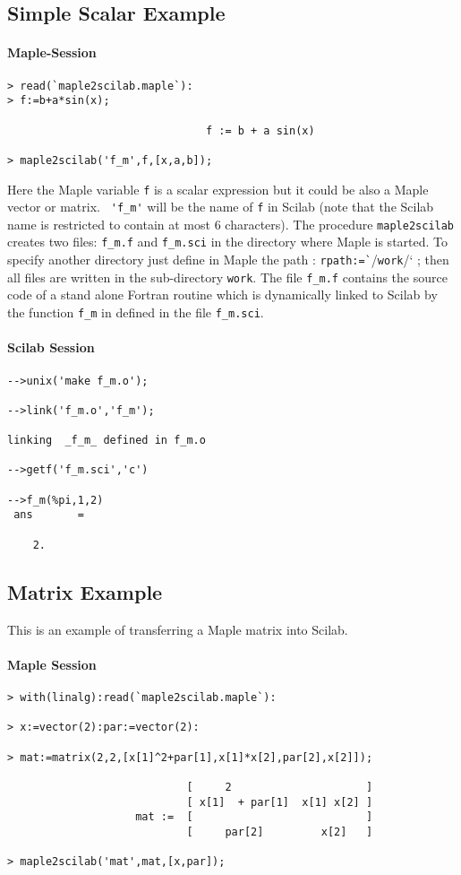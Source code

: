 \subsection{Simple Scalar Example}
\paragraph{Maple-Session}
\begin{verbatim}
> read(`maple2scilab.maple`):
> f:=b+a*sin(x);

                               f := b + a sin(x)

> maple2scilab('f_m',f,[x,a,b]);
\end{verbatim}
Here the Maple variable \verb!f! is a scalar expression but it could be also
a Maple vector or matrix.
\verb/ 'f_m'/ will be the name of \verb!f! in Scilab 
(note that the Scilab name is restricted to contain at most 6 characters).
The procedure \verb/maple2scilab/ creates two files: \verb/f_m.f/ 
and  \verb/f_m.sci/ in the directory where Maple is started.
To specify another directory just define in Maple the path : 
\verb/rpath:=`//\verb/work//` ; then all files are written in 
the sub-directory \verb/work/.
The file \verb!f_m.f! contains the source code of a stand alone Fortran
routine which is dynamically linked to Scilab by the function \verb!f_m! in
defined in the file \verb!f_m.sci!.

\paragraph{Scilab Session}
\begin{verbatim}
-->unix('make f_m.o');
 
-->link('f_m.o','f_m');

linking  _f_m_ defined in f_m.o  
 
-->getf('f_m.sci','c')
 
-->f_m(%pi,1,2)
 ans       =
 
    2.  
\end{verbatim}

\subsection{Matrix Example}
This is an example of transferring a Maple matrix into Scilab.
\paragraph{Maple Session}
\begin{verbatim}
> with(linalg):read(`maple2scilab.maple`):

> x:=vector(2):par:=vector(2):

> mat:=matrix(2,2,[x[1]^2+par[1],x[1]*x[2],par[2],x[2]]);

                            [     2                     ]
                            [ x[1]  + par[1]  x[1] x[2] ]
                    mat :=  [                           ]
                            [     par[2]         x[2]   ]

> maple2scilab('mat',mat,[x,par]);

\end{verbatim}

